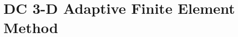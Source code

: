 \documentclass[extra, referee]{gji}
\begin{document}



\section{DC 3-D Adaptive Finite Element Method}
\end{document}

